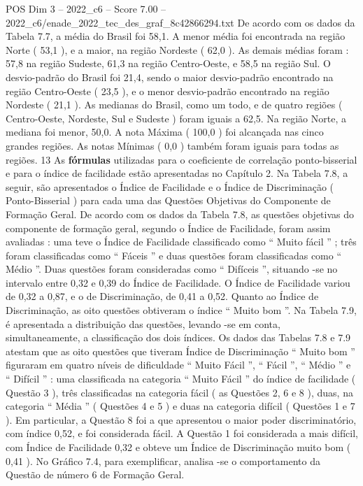 \begin{textsample}{POS Dim 3 – 2022\_c6 – Score 7.00 – 2022\_c6/enade\_2022\_tec\_des\_graf\_8c42866294.txt}
De acordo com os dados da Tabela 7.7, a média do Brasil foi 58,1.
A menor média foi encontrada na região Norte ( 53,1 ), e a maior, na região Nordeste ( 62,0 ).
As demais médias foram : 57,8 na região Sudeste, 61,3 na região Centro-Oeste, e 58,5 na região Sul.
O desvio-padrão do Brasil foi 21,4, sendo o maior desvio-padrão encontrado na região Centro-Oeste ( 23,5 ), e o menor desvio-padrão encontrado na região Nordeste ( 21,1 ).
As medianas do Brasil, como um todo, e de quatro regiões ( Centro-Oeste, Nordeste, Sul e Sudeste ) foram iguais a 62,5.
Na região Norte, a mediana foi menor, 50,0.
A nota Máxima ( 100,0 ) foi alcançada nas cinco grandes regiões.
As notas Mínimas ( 0,0 ) também foram iguais para todas as regiões. 13 As \textbf{fórmulas} utilizadas para o coeficiente de correlação ponto-bisserial e para o índice de facilidade estão apresentadas no Capítulo 2.
Na Tabela 7.8, a seguir, são apresentados o Índice de Facilidade e o Índice de Discriminação ( Ponto-Bisserial ) para cada uma das Questões Objetivas do Componente de Formação Geral.
De acordo com os dados da Tabela 7.8, as questões objetivas do componente de formação geral, segundo o Índice de Facilidade, foram assim avaliadas : uma teve o Índice de Facilidade classificado como “ Muito fácil ” ; três foram classificadas como “ Fáceis ” e duas questões foram classificadas como “ Médio ”.
Duas questões foram consideradas como “ Difíceis ”, situando -se no intervalo entre 0,32 e 0,39 do Índice de Facilidade.
O Índice de Facilidade variou de 0,32 a 0,87, e o de Discriminação, de 0,41 a 0,52.
Quanto ao Índice de Discriminação, as oito questões obtiveram o índice “ Muito bom ”.
Na Tabela 7.9, é apresentada a distribuição das questões, levando -se em conta, simultaneamente, a classificação dos dois índices.
Os dados das Tabelas 7.8 e 7.9 atestam que as oito questões que tiveram Índice de Discriminação “ Muito bom ” figuraram em quatro níveis de dificuldade “ Muito Fácil ”, “ Fácil ”, “ Médio ” e “ Difícil ” : uma classificada na categoria “ Muito Fácil ” do índice de facilidade ( Questão 3 ), três classificadas na categoria fácil ( as Questões 2, 6 e 8 ), duas, na categoria “ Média ” ( Questões 4 e 5 ) e duas na categoria difícil ( Questões 1 e 7 ).
Em particular, a Questão 8 foi a que apresentou o maior poder discriminatório, com índice 0,52, e foi considerada fácil.
A Questão 1 foi considerada a mais difícil, com Índice de Facilidade 0,32 e obteve um Índice de Discriminação muito bom ( 0,41 ).
No Gráfico 7.4, para exemplificar, analisa -se o comportamento da Questão de número 6 de Formação Geral.

\end{textsample}
